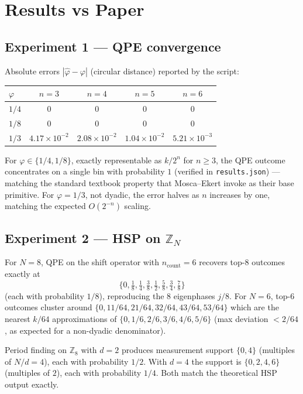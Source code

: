 \documentclass[11pt]{article}
\begin{document}
\section{Results vs Paper}

\subsection{Experiment 1 --- QPE convergence}
Absolute errors $|\hat\varphi-\varphi|$ (circular distance) reported by the script:

\begin{center}
\begin{tabular}{lcccc}
\toprule
$\varphi$ & $n=3$ & $n=4$ & $n=5$ & $n=6$ \\
\midrule
$1/4$ & $0$ & $0$ & $0$ & $0$ \\
$1/8$ & $0$ & $0$ & $0$ & $0$ \\
$1/3$ & $4.17\!\times\!10^{-2}$ & $2.08\!\times\!10^{-2}$ & $1.04\!\times\!10^{-2}$ & $5.21\!\times\!10^{-3}$ \\
\bottomrule
\end{tabular}
\end{center}

For $\varphi\in\{1/4,1/8\}$, exactly representable as $k/2^n$ for $n\ge 3$, the QPE
outcome concentrates on a single bin with probability $1$ (verified in
\texttt{results.json}) --- matching the standard textbook property that
Mosca--Ekert invoke as their base primitive. For $\varphi=1/3$, not
dyadic, the error halves as $n$ increases by one, matching the expected
$O(2^{-n})$ scaling.

\subsection{Experiment 2 --- HSP on $\mathbb{Z}_N$}

For $N=8$, QPE on the shift operator with $n_{\text{count}}=6$ recovers
top-8 outcomes exactly at
\[
\{0,\tfrac18,\tfrac14,\tfrac38,\tfrac12,\tfrac58,\tfrac34,\tfrac78\}
\]
(each with probability $1/8$), reproducing the 8 eigenphases $j/8$.
For $N=6$, top-6 outcomes cluster around $\{0, 11/64, 21/64, 32/64, 43/64, 53/64\}$
which are the nearest $k/64$ approximations of
$\{0,1/6,2/6,3/6,4/6,5/6\}$ (max deviation $< 2/64$, as expected for a non-dyadic
denominator).

Period finding on $\mathbb{Z}_8$ with $d=2$ produces measurement support
$\{0,4\}$ (multiples of $N/d = 4$), each with probability $1/2$.
With $d=4$ the support is $\{0,2,4,6\}$ (multiples of $2$), each with probability
$1/4$. Both match the theoretical HSP output exactly.
\end{document}
